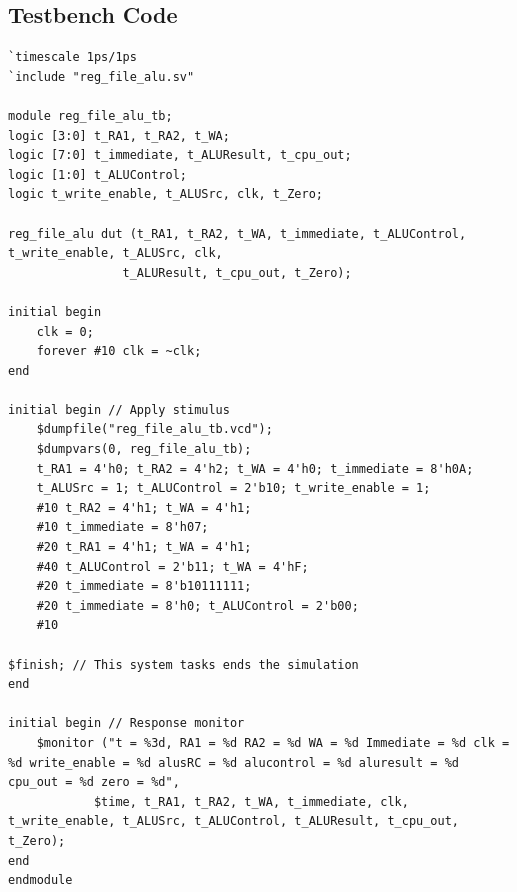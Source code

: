 \documentclass{article}
\begin{document}
\subsection{Testbench Code}
\begin{lstlisting}
`timescale 1ps/1ps 
`include "reg_file_alu.sv"

module reg_file_alu_tb;
logic [3:0] t_RA1, t_RA2, t_WA;
logic [7:0] t_immediate, t_ALUResult, t_cpu_out;
logic [1:0] t_ALUControl;
logic t_write_enable, t_ALUSrc, clk, t_Zero;

reg_file_alu dut (t_RA1, t_RA2, t_WA, t_immediate, t_ALUControl, t_write_enable, t_ALUSrc, clk, 
                t_ALUResult, t_cpu_out, t_Zero);

initial begin
    clk = 0;
    forever #10 clk = ~clk;
end

initial begin // Apply stimulus 
    $dumpfile("reg_file_alu_tb.vcd");
    $dumpvars(0, reg_file_alu_tb);
    t_RA1 = 4'h0; t_RA2 = 4'h2; t_WA = 4'h0; t_immediate = 8'h0A; 
    t_ALUSrc = 1; t_ALUControl = 2'b10; t_write_enable = 1;
    #10 t_RA2 = 4'h1; t_WA = 4'h1;
    #10 t_immediate = 8'h07;
    #20 t_RA1 = 4'h1; t_WA = 4'h1;
    #40 t_ALUControl = 2'b11; t_WA = 4'hF;
    #20 t_immediate = 8'b10111111;
    #20 t_immediate = 8'h0; t_ALUControl = 2'b00;
    #10

$finish; // This system tasks ends the simulation 
end

initial begin // Response monitor
    $monitor ("t = %3d, RA1 = %d RA2 = %d WA = %d Immediate = %d clk = %d write_enable = %d alusRC = %d alucontrol = %d aluresult = %d cpu_out = %d zero = %d",
            $time, t_RA1, t_RA2, t_WA, t_immediate, clk,  t_write_enable, t_ALUSrc, t_ALUControl, t_ALUResult, t_cpu_out, t_Zero);
end
endmodule
\end{lstlisting}
\end{document}
